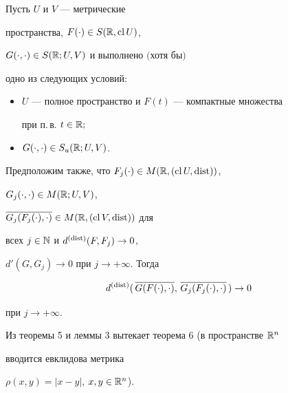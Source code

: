 \begin{lem} Пусть $U$ и $V$ --- метрические


пространства, $F(\cdot)\in S(\Bbb R,\operatorname{cl} U)$,


$G(\cdot,\cdot)\in S(\Bbb R;U,V)$ и выполнено $($хотя бы$)$


одно из следующих условий$:$


\begin{itemize}


\item[1)] $U$ --- полное пространство и $F(t)$ --- компактные множества


при п.\,в. $t\in\Bbb R;$


\item[2)] $G(\cdot,\cdot)\in S_u(\Bbb R;U,V)$.


\end{itemize}


Предположим также, что $F_j(\cdot)\in M(\Bbb R,(\operatorname{cl} U,\operatorname{dist}))$,


$G_j(\cdot,\cdot)\in M(\Bbb R;U,V)$,


$\overline{G_j(F_j(\cdot),\cdot)}\in\linebreak M(\Bbb R,(\cl V,\dist))$ для


всех $j\in\Bbb N$ и $d^{(\operatorname{dist})}(F,F_j)\to 0$,


$d'(G,G_j)\to 0$ при $j\to+\infty$. Тогда


$$


d^{(\dist)}(\,\overline{G(F(\cdot),\cdot)},\,


\overline{G_j(F_j(\cdot),\cdot)}\,)\to 0


$$


при $j\to+\infty$.


\end{lem}





Из теоремы 5 и леммы 3 вытекает теорема 6 (в пространстве $\Bbb R^n$


вводится евклидова метрика


$\rho(x,y)=|x-y|$, $x,y\in\Bbb R^n$).





